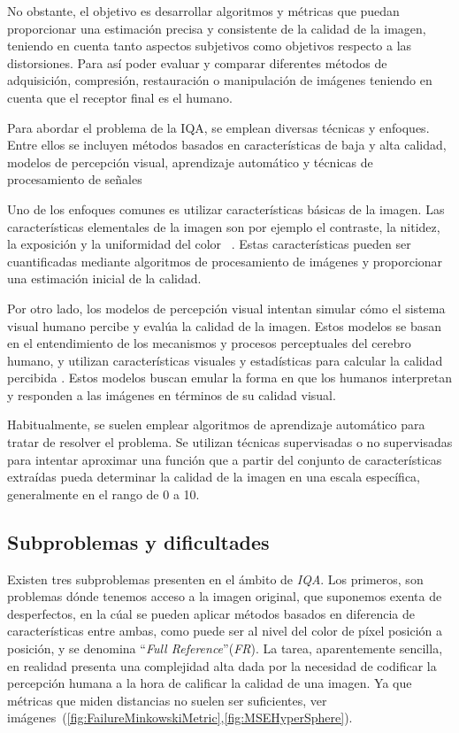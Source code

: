 No obstante, el objetivo es desarrollar algoritmos y métricas que puedan proporcionar una 
estimación precisa y consistente de la calidad de la imagen, teniendo en cuenta
tanto aspectos subjetivos como objetivos respecto a las distorsiones.
Para así poder evaluar y comparar diferentes métodos de adquisición, compresión, 
restauración o manipulación de imágenes teniendo en cuenta que el receptor 
final es el humano.
 
Para abordar el problema de la IQA, se emplean diversas técnicas y enfoques. 
Entre ellos se incluyen métodos basados en características de baja y alta calidad,
modelos de percepción visual, aprendizaje automático y técnicas de procesamiento de señales
 
Uno de los enfoques comunes es utilizar características básicas de la imagen. 
Las características elementales de la imagen son por ejemplo el contraste, 
la nitidez, la exposición y la uniformidad del color~\cite{Wang2006ModernIQ} . 
Estas características pueden ser cuantificadas mediante algoritmos de procesamiento de 
imágenes y proporcionar una estimación inicial de la calidad. 
 
Por otro lado, los modelos de percepción visual intentan simular cómo el sistema 
visual humano percibe y evalúa la calidad de la imagen. Estos modelos se basan 
en el entendimiento de los mecanismos y procesos perceptuales del cerebro humano, 
y utilizan características visuales y estadísticas para calcular la calidad percibida
\cite{MinkowskiFailure, StructuralSimilarityIndex}.
Estos modelos buscan emular la forma en que los humanos interpretan y responden 
a las imágenes en términos de su calidad visual\cite{IQAbySaliencyMaps, CascadedIQA}.
 
Habitualmente, se suelen emplear algoritmos de aprendizaje automático para tratar
de resolver el problema. Se utilizan técnicas supervisadas o no supervisadas 
para intentar aproximar una función que a partir del conjunto de características 
extraídas pueda determinar la calidad de la imagen en una escala específica, 
generalmente en el rango de 0 a 10.


\subsection{Subproblemas y dificultades}
Existen tres subproblemas presenten en el ámbito de \emph{IQA}. Los primeros, son problemas 
dónde tenemos acceso a la imagen original, que suponemos exenta de desperfectos, 
en la cúal se pueden aplicar métodos basados en diferencia de características 
entre ambas, como puede ser al nivel del color de píxel posición a posición,
y se denomina ``\emph{Full Reference}''(\emph{FR}). 
La tarea, aparentemente sencilla, en realidad presenta una complejidad alta dada por 
la necesidad de codificar la percepción humana a la hora de calificar la calidad 
de una imagen\cite{WhyIsIQASoDifficult}. Ya que métricas que miden distancias no suelen ser suficientes, 
ver imágenes~(\ref{fig:FailureMinkowskiMetric},\ref{fig:MSEHyperSphere}).
 
